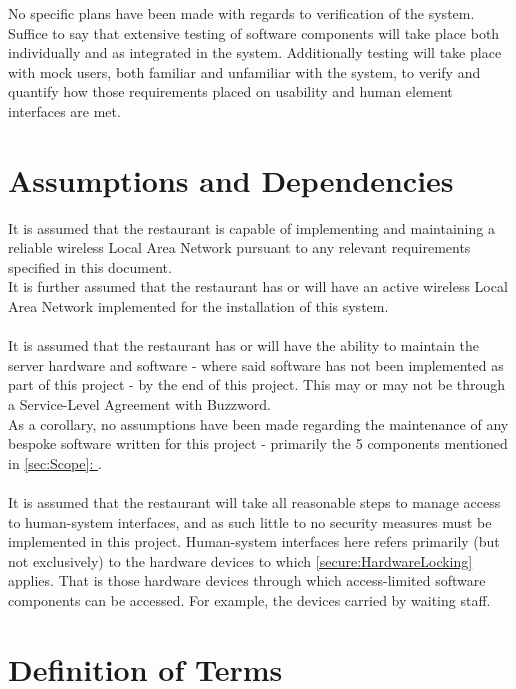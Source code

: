 \documentclass[11pt, a4paper]{report}
\newcommand{\gref}[1]{\hyperref[#1]{\autoref*{#1}: \nameref{#1}}} %
\begin{document}
No specific plans have been made with regards to verification of the system. Suffice to say that extensive testing of software components will take place both individually and as integrated in the system. Additionally testing will take place with mock users, both familiar and unfamiliar with the system, to verify and quantify how those requirements placed on usability and human element interfaces are met.

\section{Assumptions and Dependencies} \label{subsec:Assumptions}

It is assumed that the restaurant is capable of implementing and maintaining a reliable wireless Local Area Network pursuant to any relevant requirements specified in this document.\\
It is further assumed that the restaurant has or will have an active wireless Local Area Network implemented for the installation of this system.\\
\\
It is assumed that the restaurant has or will have the ability to maintain the server hardware and software - where said software has not been implemented as part of this project - by the end of this project. This may or may not be through a Service-Level Agreement with Buzzword.\\
As a corollary, no assumptions have been made regarding the maintenance of any bespoke software written for this project - primarily the 5 components mentioned in \gref{sec:Scope}.\\
\\
It is assumed that the restaurant will take all reasonable steps to manage access to human-system interfaces, and as such little to no security measures must be implemented in this project. Human-system interfaces here refers primarily (but not exclusively) to the hardware devices to which \autoref{secure:HardwareLocking} applies. That is those hardware devices through which access-limited software components can be accessed. For example, the devices carried by waiting staff.

\section{Definition of Terms} \label{subsec:Definitions}
\vspace{1cm}
\end{document}
